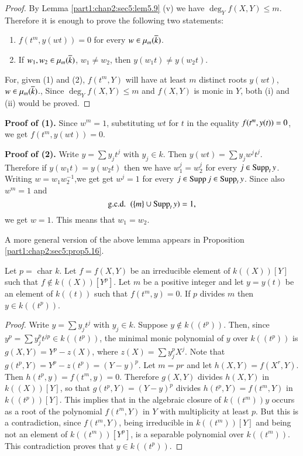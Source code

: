 \begin{proof}
  By Lemma \ref{part1:chap2:sec5:lem5.9} (v) we have $\deg_Y f(X, Y) \leq m$. Therefore it is enough to prove the following two statements:
\begin{enumerate}[(1)]
\item $f(t^m, y(wt))=0$ for every $w \in \mu_m (\overline{k})$.
\item If $w_1, w_2 \in \mu_m (\overline{k})$, $w_1 \neq w_2$, then $y(w_1t) \neq y(w_2 t)$. 
\end{enumerate}

For, given (1) and (2), $f(t^m, Y)$ will have at least $m$ distinct roots $y(wt)$, $w \in \mu_m (\overline{k})$., Since $\deg_Y f(X, Y) \leq m$ and $f(X, Y)$ is monic in $Y$, both (i) and (ii) would be proved.
\end{proof}


\medskip
\noindent \textbf{Proof of (1).} Since $w^m = 1$, substituting $wt$
for $t$ in the equality $f(t^m,\break y(t))=0$, we get $f(t^m, y(wt))=0$. 

\medskip
\noindent \textbf{Proof of (2).} Write $y= \sum y_j t^j$ with $y_j \in k$. Then $y(wt)= \sum y_j w^j t^j$. Therefore if $y(w_1 t)= y(w_2 t)$ then we have $w^j_1 = w^j_2$ for every $j \in \operatorname{Supp}_t y$. Writing $w= w_1 w^{-1}_2$,\pageoriginale we get get $w^j =1$ for every $j \in \operatorname{Supp} j \in \operatorname{Supp}_t y$. Since also $w^m=1$ and 
$$
\text{{g.c.d.}\kern.3em} ~(\{ m\}  \cup \operatorname{Supp}_t y) =1,
$$
we get $w=1$. This means that $w_1 = w_2$.

\begin{remark}\label{part1:chap2:sec5:rem5.11}
  A more general version of the above lemma appears in Proposition \ref{part1:chap2:sec5:prop5.16}.
\end{remark}

\begin{lemma}\label{part1:chap2:sec5:lem5.12}
  Let $p=$ char $k$. Let $f= f(X, Y)$ be an irreducible element of $k((X)) [Y]$ such that $f \notin k ((X)) [Y^p]$. Let $m$ be a positive integer and let $y= y(t)$ be an element of $k((t))$ such that $f(t^m, y)=0$. If $p$ divides $m$ then $y \in k ((t^p))$.
\end{lemma}

\begin{proof}
  Write $y= \sum y_j t^j$ with $y_j \in k$. Suppose $y \notin k((t^p))$. Then, since $y^p = \sum y^p_j t^{jp} \in k((t^p))$, the minimal monic polynomial of $y$ over $k((t^p))$ is $g(X, Y)= Y^p- z(X)$, where $z(X)= \sum y^p_j X^j$. Note that $g(t^p, Y) = Y^p - z(t^p)= (Y-y)^p$. Let $m=pr$ and let $h(X, Y)= f(X^r, Y)$. Then $h(t^p, y)= f(t^m, y)=0$. Therefore $g(X, Y)$ divides $h(X, Y)$ in $k ((X)) [Y]$, so that $g(t^p, Y)= (Y- y)^p$ divides $h(t^p, Y)= f(t^m, Y)$ in $k((t^p)) [Y]$. This implies that in the algebraic closure of $k((t^m))y$ occurs as a root of the polynomial $f(t^m, Y)$ in $Y$ with multiplicity at least $p$. But this is a contradiction, since $f(t^m, Y)$, being irreducible in $k((t^m))[Y]$ and being not an element of $k((t^m))[Y^p]$, is a separable polynomial over $k((t^m))$. This contradiction proves that $y \in k((t^p))$.
\end{proof}

